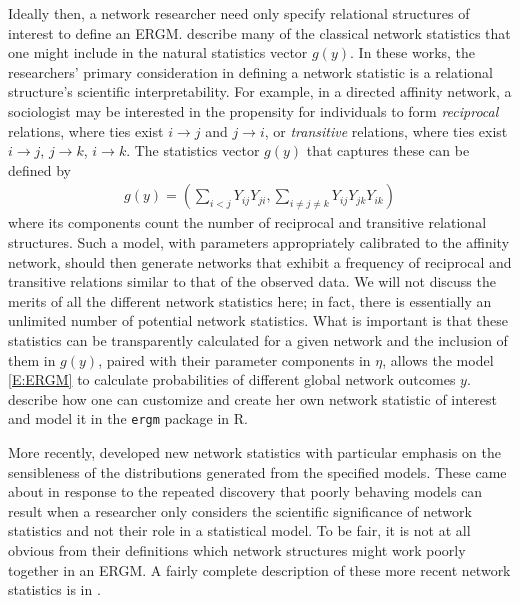 Ideally then, a network researcher need only specify relational structures of 
interest to define an ERGM.  
\citet*{Wasserman:1996, Pattison:1999, logit, introp*} describe many of 
the classical network statistics that one might include in the natural statistics vector 
$g(y)$.  In these works, the researchers' primary 
consideration in defining a network statistic is a relational structure's 
scientific interpretability.  
For example, in a directed affinity network, a sociologist may be 
interested in the propensity for individuals to form \emph{reciprocal} relations, where 
ties exist $i \to j$ and $j \to i$, or \emph{transitive} relations, where 
ties exist $i \to j$, $j \to k$, $i \to k$.  The statistics vector $g(y)$ 
that captures these can be defined by
\begin{align*}
	g(y) = \left ( \sum_{i<j} Y_{ij}Y_{ji}, \sum_{i \neq j \neq k} Y_{ij}Y_{jk}Y_{ik} 
			\right )  
\end{align*}
where its components count the number of reciprocal and transitive relational 
structures.  
Such a model, with parameters appropriately calibrated to the affinity network, 
should then generate networks that exhibit a frequency of reciprocal and 
transitive relations similar to that of the observed data.
We will not discuss the merits of all the different network statistics 
here; in fact, there is essentially an unlimited number of potential network statistics.
What is important is that these statistics can be transparently calculated for a 
given network and the inclusion of them in $g(y)$, paired with their parameter 
components in $\eta$, allows the model \eqref{E:ERGM} to calculate probabilities of 
different global network outcomes $y$.  \citet*{ergm:userterms} describe how one can
customize and create her own network statistic of interest and model it in the 
\texttt{ergm} package in R.

More recently, \citet*{Handcock:2006, Hunter:2006, recentp*} developed
new network statistics with particular emphasis on the sensibleness of 
the distributions generated from the specified models.  
These came about in response to the repeated discovery that poorly behaving models can
result when a researcher only considers the scientific significance of network
statistics and not their role in a statistical model.  To be fair, it is not 
at all obvious from their definitions which network structures might work poorly
together in an ERGM.  A fairly complete description of these more recent network 
statistics is in \citet*{Morris:2008}.  




